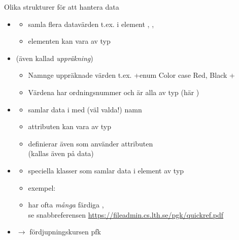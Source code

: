 \begin{Slide}{Olika strukturer för att hantera data}
\begin{itemize}\SlideFontTiny
\item {} 
\begin{itemize}\SlideFontTiny
\item samla flera datavärden t.ex.  i element , ,  
\item elementen kan vara av  typ
\end{itemize}
\item {} (även kallad \emph{uppräkning}) 
\begin{itemize}\SlideFontTiny
\item Namnge uppräknade värden t.ex. \code+enum Color { case Red, Black }+
\item Värdena har ordningsnummer och är alla av  typ (här )
\end{itemize}
\item {} 
\begin{itemize}\SlideFontTiny
\item samlar data i  med (väl valda!) namn
\item attributen kan vara av  typ
\item definierar även  som använder attributen \\ (kallas även  på data)
\end{itemize}

\item {}
  \begin{itemize}\SlideFontTiny
  \item speciella klasser som samlar data i element av  typ
  \item exempel: 
  \item har ofta \emph{många} färdiga , \\ se snabbreferensen \url{https://fileadmin.cs.lth.se/pgk/quickref.pdf}
  \end{itemize}

\item {} $\rightarrow$ fördjupningskursen pfk

\end{itemize}
\end{Slide}





